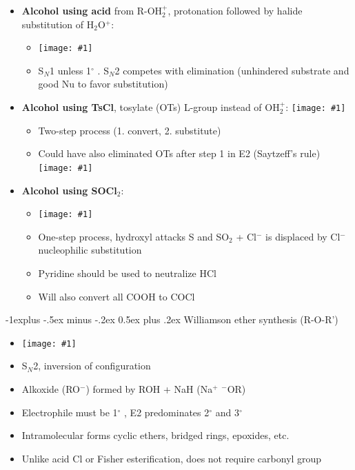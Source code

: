 \documentclass[10pt,landscape]{article}
\makeatletter
\renewcommand{\subsection}{\@startsection{subsection}{2}{0mm}%
  {-1explus -.5ex minus -.2ex}%
  {0.5ex plus .2ex}%
  {\normalfont\normalsize\bfseries}}
\newcommand{\dg}{$^\circ$ }
\newcommand{\img}[1]{\texttt{[image: \#1]}}
\makeatother
\begin{document}
\begin{multicols*}{3}
\begin{scriptsize}
    \begin{itemize}
    \item \textbf{Alcohol using acid} from R-OH$_2^+$, protonation followed by halide
      substitution of H$_2$O$^+$:
      \begin{itemize}
      \item[] \img{makingrx1.png}
      \item S$_N$1 unless 1\dg. S$_N$2 competes with elimination (unhindered substrate and
        good Nu to favor substitution)
      \end{itemize}
    \item \textbf{Alcohol using TsCl}, tosylate (OTs) L-group instead of OH$_2^+$:
      \img{makingrx2.png}
      \begin{itemize}
      \item Two-step process (1. convert, 2. substitute)
      \item Could have also eliminated OTs after step 1 in E2 (Saytzeff's rule)
        \img{elimot.png}
      \end{itemize}
    \item \textbf{Alcohol using SOCl$_2$}:
      \begin{itemize}
      \item[] \img{makingrx3.png}
      \item One-step process, hydroxyl attacks S and SO$_2$ + Cl$^-$ is displaced by
        Cl$^-$ nucleophilic substitution
      \item Pyridine should be used to neutralize HCl
      \item Will also convert all COOH to COCl
      \end{itemize}
    \end{itemize}

    \subsection{Williamson ether synthesis (R-O-R')}
    
    \begin{itemize}
    \item[] \img{williamson.png}
    \item S$_N$2, inversion of configuration
    \item Alkoxide (RO$^-$) formed by ROH + NaH (Na$^+$ $^-$OR)
    \item Electrophile must be 1\dg, E2 predominates 2\dg and 3\dg
    \item Intramolecular forms cyclic ethers, bridged rings, epoxides, etc.
    \item Unlike acid Cl or Fisher esterification, does not require carbonyl group
    \end{itemize}


\end{scriptsize}
\end{multicols*}
\end{document}
